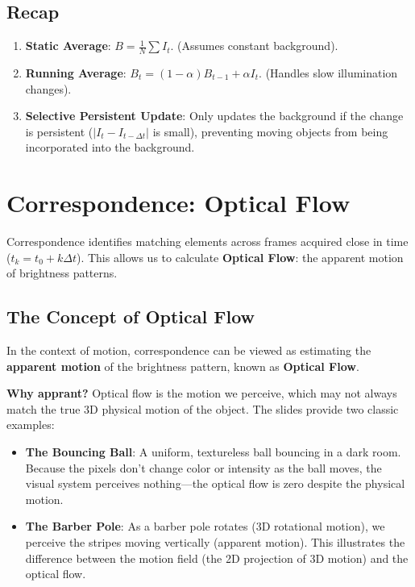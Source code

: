 \documentclass{report}
\begin{document}
\section{Recap}
\begin{enumerate}
    \item \textbf{Static Average}: $B = \frac{1}{N} \sum I_t$. (Assumes constant background).
    \item \textbf{Running Average}: $B_t = (1-\alpha)B_{t-1} + \alpha I_t$. (Handles slow illumination changes).
    \item \textbf{Selective Persistent Update}: Only updates the background if the change is persistent ($|I_t - I_{t-\Delta t}|$ is small), preventing moving objects from being incorporated into the background.
\end{enumerate}








\chapter{Correspondence: Optical Flow}
Correspondence identifies matching elements across frames acquired close in time ($t_k = t_0 + k\Delta t$).
This allows us to calculate \textbf{Optical Flow}: the apparent motion of brightness patterns.

\section{The Concept of Optical Flow}
In the context of motion, correspondence can be viewed as estimating the \textbf{apparent motion} of the brightness pattern,
known as \textbf{Optical Flow}.

\textbf{Why apprant?}
Optical flow is the motion we perceive, which may not always match the true 3D physical motion of the object.
The slides provide two classic examples:
\begin{itemize}
    \item \textbf{The Bouncing Ball}: A uniform, textureless ball bouncing in a dark room. Because the pixels don't change color
          or intensity as the ball moves, the visual system perceives nothing—the optical flow is zero despite the physical motion.
    \item \textbf{The Barber Pole}: As a barber pole rotates (3D rotational motion), we perceive the stripes moving vertically
          (apparent motion). This illustrates the difference between the motion field (the 2D projection of 3D motion) and the optical flow.
\end{itemize}
\end{document}
